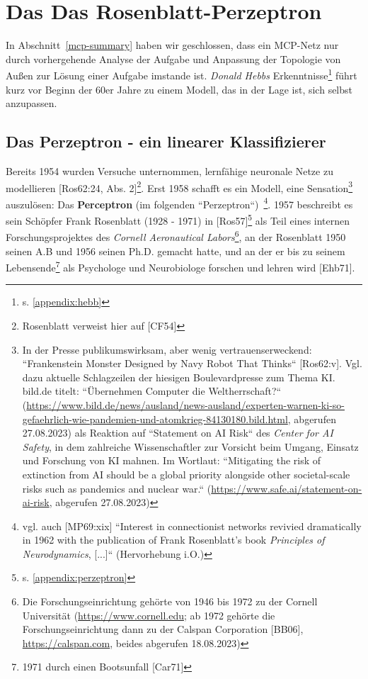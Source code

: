 \section{Das Das Rosenblatt-Perzeptron}

In Abschnitt~\ref{mcp-summary} haben wir geschlossen, dass ein MCP-Netz nur durch vorhergehende Analyse der Aufgabe und Anpassung der Topologie von Außen zur Lösung einer Aufgabe imstande ist.
\textit{Donald Hebbs} Erkenntnisse\footnote{
    s. \ref{appendix:hebb}
} führt kurz vor Beginn der 60er Jahre zu einem Modell, das in der Lage ist, sich selbst anzupassen.


\subsection{Das Perzeptron - ein linearer Klassifizierer}

Bereits 1954 wurden Versuche unternommen, lernfähige neuronale Netze zu modellieren [Ros62:24, Abs. 2]\footnote{
    Rosenblatt verweist hier auf [CF54]
}.
Erst 1958 schafft es ein Modell, eine Sensation\footnote{
    In der Presse publikumswirksam, aber wenig vertrauenserweckend: ``Frankenstein Monster Designed by Navy Robot That Thinks`` [Ros62:v]. Vgl. dazu aktuelle Schlagzeilen der hiesigen Boulevardpresse zum Thema KI. bild.de titelt: ``Übernehmen Computer die Weltherrschaft?`` (\url{https://www.bild.de/news/ausland/news-ausland/experten-warnen-ki-so-gefaehrlich-wie-pandemien-und-atomkrieg-84130180.bild.html}, abgerufen 27.08.2023) als Reaktion auf ``Statement on AI Risk`` des \textit{Center for AI Safety}, in dem zahlreiche Wissenschaftler zur Vorsicht beim Umgang, Einsatz und Forschung von KI mahnen. Im Wortlaut: ``Mitigating the risk of extinction from AI should be a global priority alongside other societal-scale risks such as pandemics and nuclear war.`` (\url{https://www.safe.ai/statement-on-ai-risk}, abgerufen 27.08.2023)
} auszulösen: Das \textbf{Perceptron} (im folgenden ``Perzeptron``)~\cite[89]{AR88}\footnote{
    vgl. auch [MP69:xix] ``Interest in connectionist networks revivied dramatically in 1962 with the publication of Frank Rosenblatt's book \textit{Principles of Neurodynamics}, [...]`` (Hervorhebung i.O.)
}.
1957 beschreibt es sein Schöpfer Frank Rosenblatt (1928 - 1971) in [Ros57]\footnote{
    s. \ref{appendix:perzeptron}
} als Teil eines internen Forschungsprojektes des \textit{Cornell Aeronautical Labors}\footnote{
    Die Forschungseinrichtung gehörte von 1946 bis 1972 zu der Cornell Universität (\url{https://www.cornell.edu}; ab 1972 gehörte die Forschungseinrichtung dann zu der Calspan Corporation [BB06], \url{https://calspan.com}, beides abgerufen 18.08.2023)
}, an der Rosenblatt 1950 seinen A.B und 1956 seinen Ph.D. gemacht hatte, und an der er bis zu seinem Lebensende\footnote{
    1971 durch einen Bootsunfall [Car71]
} als Psychologe und Neurobiologe forschen und lehren wird [Ehb71].


